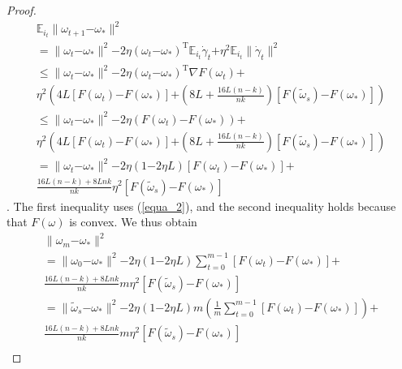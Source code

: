 \documentclass[letterpaper]{article}
\begin{document}
\begin{proof}
\begin{equation}
\begin{array}{ll}
\mathbb{E}_{i_t}\parallel  \omega_{t+1}\mathrm{-}\omega_\ast \parallel^2\\
=\parallel  \omega_{t}\mathrm{-}\omega_\ast  \parallel^2  \mathrm{-}2\eta(\omega_t\mathrm{-}\omega_\ast)^\mathrm{T}\mathbb{E}_{i_t}\dot{\gamma}_{t}  \mathrm{+}  \eta^2 \mathbb{E}_{i_t}\parallel  \dot{\gamma}_{t}  \parallel^2  \\
\le \parallel  \omega_{t}\mathrm{-}\omega_\ast  \parallel^2  \mathrm{-}2\eta(\omega_t\mathrm{-}\omega_\ast)^\mathrm{T}\nabla F(\omega_t) \mathrm{+} \\
\eta^2 \left(  4L [F(\omega_t)\mathrm{-}F(\omega_\ast)] \mathrm{+} \left( 8L+ \frac{16L(n-k)}{nk}\right) [F(\tilde{\omega}_s)\mathrm{-}F(\omega_\ast)] \right)  \\ 
\le \parallel  \omega_{t}\mathrm{-}\omega_\ast  \parallel^2  \mathrm{-}2\eta( F(\omega_t) \mathrm{-} F(\omega_\ast) ) \mathrm{+} \\
\eta^2 \left(  4L [F(\omega_t)\mathrm{-}F(\omega_\ast)] \mathrm{+} \left( 8L+ \frac{16L(n-k)}{nk}\right) [F(\tilde{\omega}_s)\mathrm{-}F(\omega_\ast)]\right)  \\ 
= \parallel  \omega_{t}\mathrm{-}\omega_\ast  \parallel^2  \mathrm{-}2\eta(1\mathrm{-}2\eta L) [F(\omega_t) \mathrm{-} F(\omega_\ast) ] \mathrm{+} \\
\frac{16L(n-k)+8Lnk}{nk} \eta^2 [F(\tilde{\omega}_s)\mathrm{-}F(\omega_\ast)]
\end{array} 
\end{equation}. The first inequality uses (\ref{equa_2}), and the second inequality holds because that $F(\omega)$ is convex.  We thus obtain 
\begin{equation}
\begin{array}{ll}
\parallel  \omega_{m}\mathrm{-}\omega_\ast \parallel^2\\
= \parallel  \omega_{0}\mathrm{-}\omega_\ast  \parallel^2  \mathrm{-}2\eta(1\mathrm{-}2\eta L)\sum\limits_{t=0}^{m-1} [F(\omega_t) \mathrm{-} F(\omega_\ast) ] \mathrm{+} \\
\frac{16L(n-k)+8Lnk}{nk} m \eta^2 [F(\tilde{\omega}_s)\mathrm{-}F(\omega_\ast)]\\
=\parallel  \tilde{\omega}_{s}\mathrm{-}\omega_\ast  \parallel^2  \mathrm{-}2\eta(1\mathrm{-}2\eta L)m \left(\frac{1}{m}\sum\limits_{t=0}^{m-1} [F(\omega_t) \mathrm{-} F(\omega_\ast) ] \right)\mathrm{+} \\
\frac{16L(n-k)+8Lnk}{nk} m \eta^2 [F(\tilde{\omega}_s)\mathrm{-}F(\omega_\ast)]\\

\end{array}
\end{equation}
\end{proof}
\end{document}
